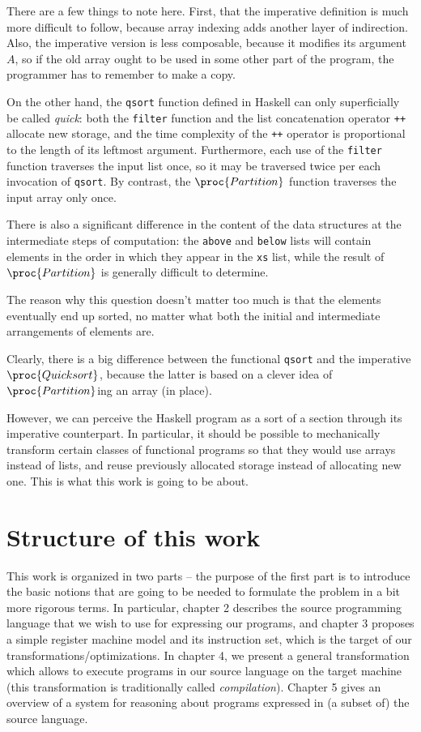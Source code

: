 There are a few things to note here. First, that the imperative definition
is much more difficult to follow, because array indexing adds another
layer of indirection. Also, the imperative version is less composable,
because it modifies its argument $A$, so if the old array ought to be
used in some other part of the program, the programmer has to remember
to make a copy.

On the other hand, the \texttt{qsort} function defined in Haskell
can only superficially be called \emph{quick}: both the \texttt{filter}
function and the list concatenation operator \texttt{++} allocate new
storage, and the time complexity of the \texttt{++} operator is proportional
to the length of its leftmost argument. Furthermore, each use of
the \texttt{filter} function traverses the input list once, so
it may be traversed twice per each invocation of \texttt{qsort}.
By contrast, the $\proc{Partition}$ function traverses
the input array only once.

There is also a significant difference in the content of the data
structures at the intermediate steps of computation: the \texttt{above}
and \texttt{below} lists will contain elements in the order in which
they appear in the \texttt{xs} list, while the result of $\proc{Partition}$
is generally difficult to determine. 

The reason why this question doesn't matter too much is that the elements
eventually end up sorted, no matter what both the initial and intermediate
arrangements of elements are.

Clearly, there is a big difference between the functional \texttt{qsort}
and the imperative $\proc{Quicksort}$, because the latter is based
on a clever idea of $\proc{Partition}$ing an array (in place).

However, we can perceive the Haskell program as a sort of a section through
its imperative counterpart. In particular, it should be possible
to mechanically transform certain classes of functional programs so
that they would use arrays instead of lists, and reuse previously allocated
storage instead of allocating new one. This is what this work is going to
be about.

\section{Structure of this work}

This work is organized in two parts -- the purpose of the first part
is to introduce the basic notions that are going to be needed
to formulate the problem in a bit more rigorous terms. In particular,
chapter 2 describes the source programming language that we wish to use
for expressing our programs, and chapter 3 proposes a simple register
machine model and its instruction set, which is the target of our
transformations/optimizations. In chapter 4, we present a general
transformation which allows to execute programs in our source
language on the target machine (this transformation is traditionally
called \textit{compilation}). Chapter 5 gives an overview of a
system for reasoning about programs expressed in (a subset of)
the source language.

